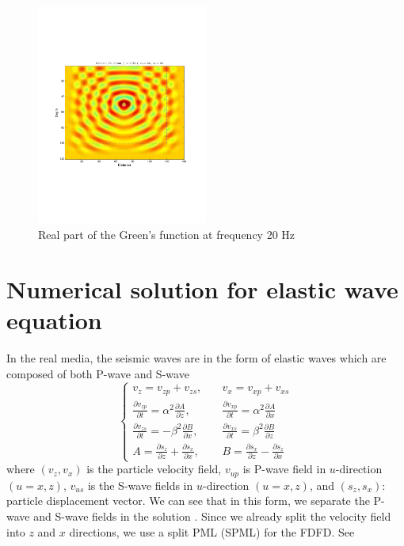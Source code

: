 \documentclass[11pt]{article}
\theoremstyle{plain}
\theoremstyle{definition}
\theoremstyle{remark}
\numberwithin{equation}{section}
\begin{document}
  \begin{figure}
  \centering
  \includegraphics[width=0.5\textwidth]{Fig/GreensFunction.pdf}
  \caption{Real part of the Green's function at frequency 20 Hz} 
  \end{figure}


\section{Numerical solution for elastic wave equation}
In the real media, the seismic waves are in the form of elastic waves which are composed of both P-wave and S-wave
\begin{equation}
    \left\{
    \begin{aligned}
    v_z=v_{zp}+v_{zs}, \quad &v_x=v_{xp}+v_{xs}\\
    \frac{\partial v_{zp}}{\partial t}=\alpha^2 \frac{\partial A}{\partial z}, \quad &\frac{\partial v_{xp}}{\partial t}=\alpha^2 \frac{\partial A}{\partial x}\\
    \frac{\partial v_{zs}}{\partial t}=-\beta^2 \frac{\partial B}{\partial x}, \quad &\frac{\partial v_{xs}}{\partial t}=\beta^2 \frac{\partial B}{\partial z}\\
    A=\frac{\partial s_z}{\partial z}+\frac{\partial s_x}{\partial x}, \quad &B=\frac{\partial s_x}{\partial z}-\frac{\partial s_z}{\partial x}
    \end{aligned}
    \right.
    \end{equation}
  where $(v_z, v_x)$ is the particle velocity field, $v_{up}$ is P-wave field in $u$-direction $(u=x, z)$,
  $v_{us}$ is the S-wave fields in $u$-direction $(u=x, z)$, and $(s_z, s_x)$: particle displacement vector.
  We can see that in this form, we separate the P-wave and S-wave fields in the solution \cite{Che2014}. Since 
  we already split the velocity field into $z$ and $x$ directions, we use a split PML (SPML) for the FDFD. See 
    
\end{document}
